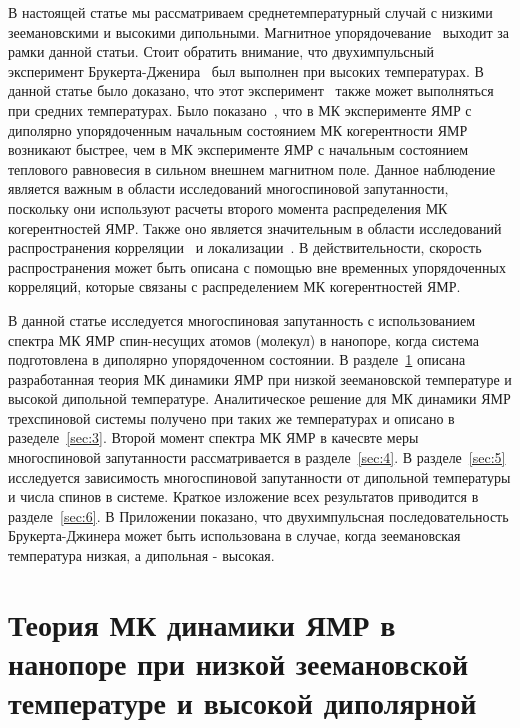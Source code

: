 \documentclass[review]{elsarticle}
\begin{document}
В настоящей статье мы рассматриваем среднетемпературный случай с низкими зеемановскими и высокими дипольными.
Магнитное упорядочевание~\cite{Abragam_1982} выходит за рамки данной статьи.
Стоит обратить внимание, что двухимпульсный эксперимент     Брукерта-Дженира~\cite{Jeener_1967} был выполнен при высоких температурах.
В данной статье было доказано, что этот эксперимент~\cite{Jeener_1967} также может выполняться при средних температурах.  
Было показано~\cite{Doronin_2011}, что в МК эксперименте ЯМР с диполярно упорядоченным начальным состоянием МК когерентности ЯМР возникают быстрее, 
чем в МК эксперименте ЯМР с начальным состоянием теплового равновесия в сильном внешнем магнитном поле.
Данное наблюдение является важным в области исследований многоспиновой запутанности, поскольку они используют расчеты второго момента распределения МК когерентностей ЯМР. 
Также оно является значительным в области исследований распространения корреляции~\cite{Baugh_2001,Baum_1986,S_nchez_2014,Munowitz_1987} и локализации~\cite{Alvarez_2015,Wei_2018}.
В действительности, скорость распространения может быть описана с помощью вне временных упорядоченных корреляций, которые связаны с распределением МК когерентностей ЯМР.

В данной статье исследуется многоспиновая запутанность с использованием спектра МК ЯМР спин-несущих атомов (молекул) в нанопоре, когда система подготовлена в диполярно упорядоченном состоянии.
В разделе~\ref{sec:2} описана разработанная теория МК динамики ЯМР при низкой зеемановской температуре и высокой дипольной температуре.
Аналитическое решение для МК динамики ЯМР трехспиновой системы получено при таких же температурах и описано в разеделе~\ref{sec:3}.
Второй момент спектра МК ЯМР в качесвте меры многоспиновой запутанности рассматривается в разделе~\ref{sec:4}.
В разделе~\ref{sec:5} исследуется зависимость многоспиновой запутанности от дипольной температуры и числа спинов в системе.
Краткое изложение всех результатов приводится в разделе~\ref{sec:6}.
В Приложении показано, что двухимпульсная последовательность Брукерта-Джинера может быть использована в случае, когда зеемановская температура низкая, а дипольная - высокая.



\section{Теория МК динамики ЯМР в нанопоре при низкой зеемановской температуре и высокой диполярной}
\label{sec:2}
\end{document}
